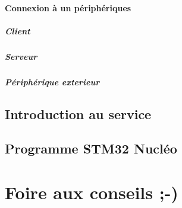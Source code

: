 \documentclass[a4paper,10pt]{article}
\begin{document}
	\paragraph{Connexion à un périphériques}
	
	\subparagraph{Client}
	
	\subparagraph{Serveur}
	
	\subparagraph{Périphérique exterieur}
	

\subsection{Introduction au service}
\subsection{Programme STM32 Nucléo}


\section{Foire aux conseils ;-)}
\end{document}
